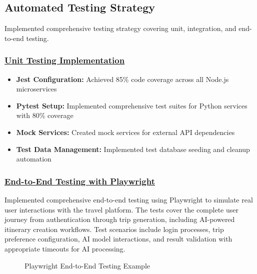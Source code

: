 \subsection{Automated Testing Strategy}
Implemented comprehensive testing strategy covering unit, integration, and end-to-end testing.

\subsubsection*{\underline{Unit Testing Implementation}}
\begin{itemize}
    \item \textbf{Jest Configuration:} Achieved 85\% code coverage across all Node.js microservices
    \item \textbf{Pytest Setup:} Implemented comprehensive test suites for Python services with 80\% coverage
    \item \textbf{Mock Services:} Created mock services for external API dependencies
    \item \textbf{Test Data Management:} Implemented test database seeding and cleanup automation
\end{itemize}

\subsubsection*{\underline{End-to-End Testing with Playwright}}
Implemented comprehensive end-to-end testing using Playwright to simulate real user interactions with the travel platform. The tests cover the complete user journey from authentication through trip generation, including AI-powered itinerary creation workflows. Test scenarios include login processes, trip preference configuration, AI model interactions, and result validation with appropriate timeouts for AI processing.

\begin{figure}[H]
    \centering
    \caption{Playwright End-to-End Testing Example}
    \label{fig:playwright-testing}
\end{figure}

